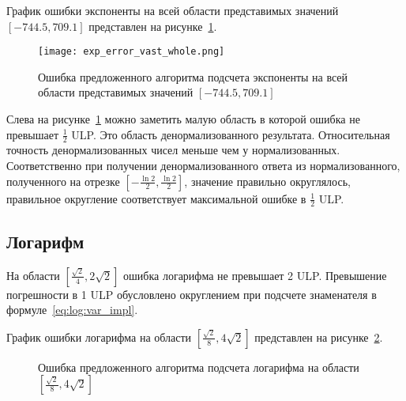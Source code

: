 График ошибки экспоненты на всей области представимых значений \newline $[-744.5, 709.1]$ представлен на рисунке~\ref{plot:exp:whole}.

\begin{figure}[hbt]
    \centering
    \texttt{[image: exp\_error\_vast\_whole.png]}
    \caption{Ошибка предложенного алгоритма подсчета экспоненты на всей области представимых значений $[-744.5, 709.1]$}
    \label{plot:exp:whole}
\end{figure}

Слева на рисунке~\ref{plot:exp:whole} можно заметить малую область в которой ошибка не превышает $\frac{1}{2}$ ULP.
Это область денормализованного результата.
Относительная точность денормализованных чисел меньше чем у нормализованных.
Соответственно при получении денормализованного ответа из нормализованного, полученного на отрезке $[-\frac{\ln{2}}{2}, \frac{\ln{2}}{2}]$, значение правильно округлялось, правильное округление соответствует максимальной ошибке в $\frac{1}{2}$ ULP.

\subsection{Логарифм}

На области $[\frac{\sqrt{2}}{4}, 2\sqrt{2}]$ ошибка логарифма не превышает 2 ULP.
Превышение погрешности в 1 ULP обусловлено округлением при подсчете знаменателя в формуле~\ref{eq:log:var_impl}.

График ошибки логарифма на области $[\frac{\sqrt{2}}{8}, 4\sqrt{2}]$ представлен на рисунке~\ref{plot:log:small}.

\begin{figure}[hbt]
  \centering
  \caption{Ошибка предложенного алгоритма подсчета логарифма на области $[\frac{\sqrt{2}}{8}, 4\sqrt{2}]$}
  \label{plot:log:small}
\end{figure}

